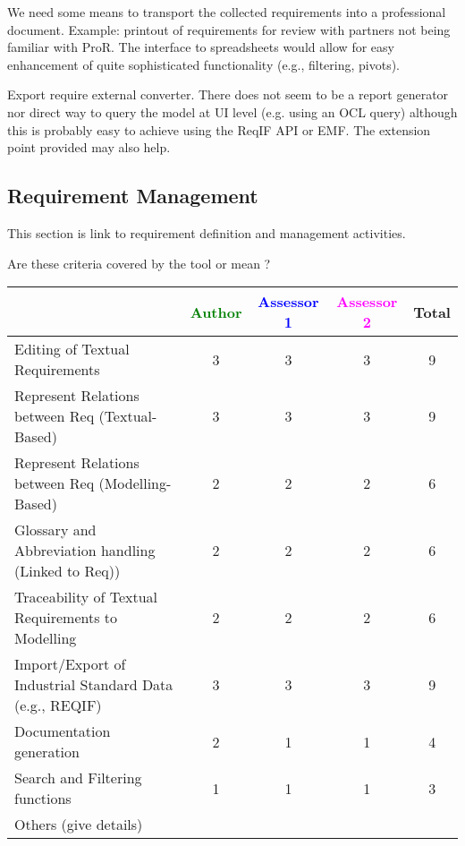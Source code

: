 \begin{assessor1}
We need some means to transport the collected requirements into a professional document. Example: printout of requirements for review with partners not being familiar with ProR. The interface to spreadsheets would allow for easy enhancement of quite sophisticated functionality (e.g., filtering, pivots).
\end{assessor1}

\begin{assessor2}
Export require external converter. There does not seem to be a report generator nor direct way to query the model at UI level (e.g. using an OCL query) although this is probably easy to achieve using the ReqIF API or EMF. The extension point provided may also help.
\end{assessor2}

\subsection{Requirement Management}

This section is link to requirement definition and management activities.

Are these criteria covered by the tool or mean ?


\begin{tabular}{|l | c | c | c | c|}
\hline
& \textcolor{green}{Author} & \textcolor{blue}{Assessor 1} & \textcolor{magenta}{Assessor 2} & Total \\
\hline
Editing of Textual Requirements & 3 & 3 & 3 & 9 \\
\hline
Represent Relations between Req (Textual-Based) & 3 & 3 & 3 & 9 \\
\hline
Represent Relations between Req (Modelling-Based) & 2 & 2 & 2 & 6 \\
\hline
Glossary and Abbreviation handling (Linked to Req)) & 2 & 2 & 2 & 6 \\
\hline
Traceability of Textual Requirements to Modelling & 2 & 2 & 2 & 6 \\
\hline
Import/Export of Industrial Standard Data (e.g., REQIF) & 3 & 3 & 3 & 9 \\
\hline
Documentation generation & 2 & 1 & 1 & 4 \\
\hline
Search and Filtering functions & 1 & 1 & 1 & 3 \\
\hline
Others (give details) & & & & \\
\hline
\end{tabular}

